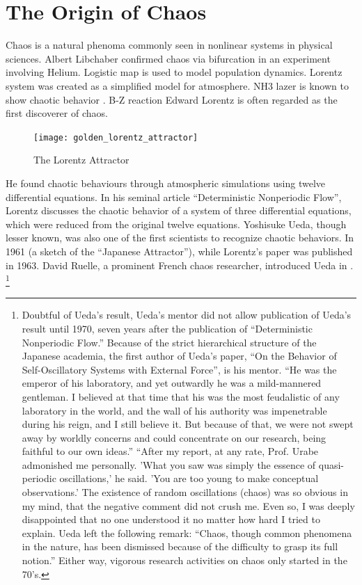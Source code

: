 \documentclass[12pt,twoside,draft]{book}
\begin{document}
\section{The Origin of Chaos}
Chaos is a natural phenoma commonly seen in nonlinear systems in physical sciences.
Albert Libchaber confirmed chaos via bifurcation in an experiment involving Helium.
Logistic map is used to model population dynamics.
Lorentz system was created as a simplified model for atmosphere.
NH3 lazer is known to show chaotic behavior \citep{kantz-schreiber}.
B-Z reaction
Edward Lorentz is often regarded as the first discoverer of chaos.
\begin{figure}[ht]
  \centering
  \texttt{[image: golden\_lorentz\_attractor]}
  \caption{The Lorentz Attractor}
  \label{fig:lorentz}
\end{figure}
He found chaotic behaviours through atmospheric simulations using twelve differential equations.
In his seminal article ``Deterministic Nonperiodic Flow'', Lorentz discusses the chaotic behavior of a system of three differential equations, which were reduced from the original twelve equations.
Yoshisuke Ueda, though lesser known, was also one of the first scientists to recognize chaotic behaviors.
In 1961 (a sketch of the ``Japanese Attractor''), while Lorentz's paper was published in 1963.
David Ruelle, a prominent French chaos researcher, introduced Ueda in \citep{ruelle}.
\footnote{Doubtful of Ueda's result, Ueda's mentor did not allow publication of Ueda's result until 1970, seven years after the publication of ``Deterministic Nonperiodic Flow.''
  Because of the strict hierarchical structure of the Japanese academia, the first author of Ueda's paper, ``On the Behavior of Self-Oscillatory Systems with External Force'', is his mentor.%
  ``He was the emperor of his laboratory, and yet outwardly he was a mild-mannered gentleman.
  I believed at that time that his was the most feudalistic of any laboratory in the world, and the wall of his authority was impenetrable during his reign, and I still believe it.
  But because of that, we were not swept away by worldly concerns and could concentrate on our research, being faithful to our own ideas.''
  ``After my report, at any rate, Prof. Urabe admonished me personally.
  'What you saw was simply the essence of quasi-periodic oscillations,' he said.
  'You are too young to make conceptual observations.'
  The existence of random oscillations (chaos) was so obvious in my mind, that the negative comment did not crush me.
  Even so, I was deeply disappointed that no one understood it no matter how hard I tried to explain.\citep[p47]{ueda-abraham}
  Ueda left the following remark: ``Chaos, though common phenomena in the nature, has been dismissed because of the difficulty to grasp its full notion.''\citep[p533]{gleick}
Either way, vigorous research activities on chaos only started in the 70's.}
\end{document}
